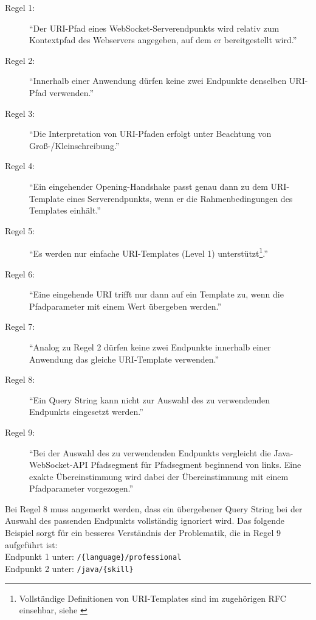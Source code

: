 \documentclass[11pt,a4paper,titlepage]{scrartcl}
\numberwithin{equation}{section}
\begin{document}
\begin{description}
	\item[Regel 1:] \textquotedblleft Der URI-Pfad eines WebSocket-Serverendpunkts wird relativ zum Kontextpfad des Webservers angegeben, auf dem er bereitgestellt wird.\textquotedblright
	\item[Regel 2:] \textquotedblleft Innerhalb einer Anwendung dürfen keine zwei Endpunkte denselben URI-Pfad verwenden.\textquotedblright
	\item[Regel 3:] \textquotedblleft Die Interpretation von URI-Pfaden erfolgt unter Beachtung von Groß-/Kleinschreibung.\textquotedblright
	\item[Regel 4:] \textquotedblleft Ein eingehender Opening-Handshake passt genau dann zu dem URI-Template eines Serverendpunkts, wenn er die Rahmenbedingungen des Templates einhält.\textquotedblright
	\item[Regel 5:] \textquotedblleft Es werden nur einfache URI-Templates (Level 1) unterstützt\footnote{Vollständige Definitionen von URI-Templates sind im zugehörigen RFC einsehbar, siehe \autocite{nottingham_uri_2012}}.\textquotedblright
	\item[Regel 6:] \textquotedblleft Eine eingehende URI trifft nur dann auf ein Template zu, wenn die Pfadparameter mit einem Wert übergeben werden.\textquotedblright
	\item[Regel 7:] \textquotedblleft Analog zu Regel 2 dürfen keine zwei Endpunkte innerhalb einer Anwendung das gleiche URI-Template verwenden.\textquotedblright
	\item[Regel 8:] \textquotedblleft Ein Query String kann nicht zur Auswahl des zu verwendenden Endpunkts eingesetzt werden.\textquotedblright
	\item[Regel 9:] \textquotedblleft Bei der Auswahl des zu verwendenden Endpunkts vergleicht die Java-WebSocket-API Pfadsegment für Pfadsegment beginnend von links. Eine exakte Übereinstimmung wird dabei der Übereinstimmung mit einem Pfadparameter vorgezogen.\textquotedblright 
\end{description}

\noindent Bei Regel 8 muss angemerkt werden, dass ein übergebener Query String bei der Auswahl des passenden Endpunkts vollständig ignoriert wird. Das folgende Beispiel sorgt für ein besseres Verständnis der Problematik, die in Regel 9 aufgeführt ist:\\

\noindent Endpunkt 1 unter: \texttt{/\{language\}/professional}\\
\noindent Endpunkt 2 unter: \texttt{/java/\{skill\}}\\
\end{document}
